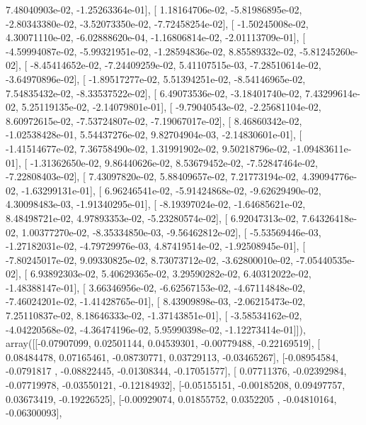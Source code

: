 \documentclass{article}
\begin{document}
          7.48040903e-02,  -1.25263364e-01],
       [  1.18164706e-02,  -5.81986895e-02,  -2.80343380e-02,
         -3.52073350e-02,  -7.72458254e-02],
       [ -1.50245008e-02,   4.30071110e-02,  -6.02888620e-04,
         -1.16806814e-02,  -2.01113709e-01],
       [ -4.59994087e-02,  -5.99321951e-02,  -1.28594836e-02,
          8.85589332e-02,  -5.81245260e-02],
       [ -8.45414652e-02,  -7.24409259e-02,   5.41107515e-03,
         -7.28510614e-02,  -3.64970896e-02],
       [ -1.89517277e-02,   5.51394251e-02,  -8.54146965e-02,
          7.54835432e-02,  -8.33537522e-02],
       [  6.49073536e-02,  -3.18401740e-02,   7.43299614e-02,
          5.25119135e-02,  -2.14079801e-01],
       [ -9.79040543e-02,  -2.25681104e-02,   8.60972615e-02,
         -7.53724807e-02,  -7.19067017e-02],
       [  8.46860342e-02,  -1.02538428e-01,   5.54437276e-02,
          9.82704904e-03,  -2.14830601e-01],
       [ -1.41514677e-02,   7.36758490e-02,   1.31991902e-02,
          9.50218796e-02,  -1.09483611e-01],
       [ -1.31362650e-02,   9.86440626e-02,   8.53679452e-02,
         -7.52847464e-02,  -7.22808403e-02],
       [  7.43097820e-02,   5.88409657e-02,   7.21773194e-02,
          4.39094776e-02,  -1.63299131e-01],
       [  6.96246541e-02,  -5.91424868e-02,  -9.62629490e-02,
          4.30098483e-03,  -1.91340295e-01],
       [ -8.19397024e-02,  -1.64685621e-02,   8.48498721e-02,
          4.97893353e-02,  -5.23280574e-02],
       [  6.92047313e-02,   7.64326418e-02,   1.00377270e-02,
         -8.35334850e-03,  -9.56462812e-02],
       [ -5.53569446e-03,  -1.27182031e-02,  -4.79729976e-03,
          4.87419514e-02,  -1.92508945e-01],
       [ -7.80245017e-02,   9.09330825e-02,   8.73073712e-02,
         -3.62800010e-02,  -7.05440535e-02],
       [  6.93892303e-02,   5.40629365e-02,   3.29590282e-02,
          6.40312022e-02,  -1.48388147e-01],
       [  3.66346956e-02,  -6.62567153e-02,  -4.67114848e-02,
         -7.46024201e-02,  -1.41428765e-01],
       [  8.43909898e-03,  -2.06215473e-02,   7.25110837e-02,
          8.18646333e-02,  -1.37143851e-01],
       [ -3.58534162e-02,  -4.04220568e-02,  -4.36474196e-02,
          5.95990398e-02,  -1.12273414e-01]]), array([[-0.07907099,  0.02501144,  0.04539301, -0.00779488, -0.22169519],
       [ 0.08484478,  0.07165461, -0.08730771,  0.03729113, -0.03465267],
       [-0.08954584, -0.0791817 , -0.08822445, -0.01308344, -0.17051577],
       [ 0.07711376, -0.02392984, -0.07719978, -0.03550121, -0.12184932],
       [-0.05155151, -0.00185208,  0.09497757,  0.03673419, -0.19226525],
       [-0.00929074,  0.01855752,  0.0352205 , -0.04810164, -0.06300093],
\end{document}
